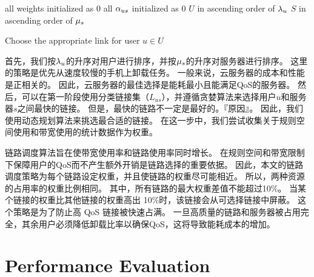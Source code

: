 \begin{algorithm}[h]
\setstretch{\algostretch}
all weights initialized as $0$
all ${\alpha}_{us}$ initialized as $0$
$U$ in ascending order of ${\lambda}_{u}$
$S$ in ascending order of ${\mu}_{s}$
\KwOut{$\xusl$}
\caption{Choose the appropriate link for user $u \in U$}
\label{algo_findminpaths}
\end{algorithm}

首先，我们按${\lambda}_{u}$的升序对用户进行排序，并按${\mu}_{s}$的升序对服务器进行排序。 这里的策略是优先从速度较慢的手机上卸载任务。 一般来说，云服务器的成本和性能是正相关的。 因此，云服务器的最佳选择是能耗最小且能满足QoS的服务器。 然后，可以在第一阶段使用分类链接集（$L_{us}$），并遵循贪婪算法来选择用户$u$和服务器$s$之间最快的链接。 但是，最快的链路不一定是最好的。『原因』。 因此，我们使用动态规划算法来挑选最合适的链接。 在这一步中，我们尝试收集关于规则空间使用和带宽使用的统计数据作为权重。

链路调度算法旨在使带宽使用率和链路使用率同时增长。 在规则空间和带宽限制下保障用户的QoS而不产生额外开销是链路选择的重要依据。 因此，本文的链路调度策略为每个链路设定权重，并且使链路的权重尽可能相近。 所以，两种资源的占用率的权重比例相同。 其中，所有链路的最大权重差值不能超过10\%。 当某个链接的权重比其他链接的权重高出 10\%时，该链接会从可选择链接中屏蔽。 这个策略是为了防止高 QoS 链接被快速占满。 一旦高质量的链路和服务器被占用完全，其余用户必须降低卸载比率以确保QoS，这将导致能耗成本的增加。

\section{Performance Evaluation}

